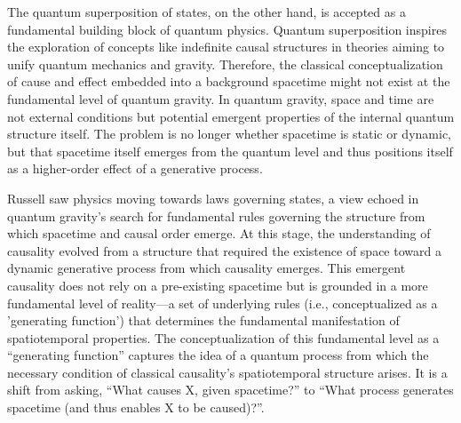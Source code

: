 The quantum superposition of states, on the other hand, is accepted as a fundamental building block of quantum physics. Quantum superposition inspires the exploration of concepts like indefinite causal structures in theories aiming to unify quantum mechanics and gravity. Therefore, the classical conceptualization of cause and effect embedded into a background spacetime might not exist at the fundamental level of quantum gravity. In quantum gravity, space and time are not external conditions but potential emergent properties of the internal quantum structure itself. The problem is no longer whether spacetime is static or dynamic, but that spacetime itself emerges from the quantum level and thus positions itself as a higher-order effect of a generative process.

Russell saw physics moving towards laws governing states, a view echoed in quantum gravity's search for fundamental rules governing the structure from which spacetime and causal order emerge. At this stage, the understanding of causality evolved from a structure that required the existence of space toward a dynamic generative process from which causality emerges. This emergent causality does not rely on a pre-existing spacetime but is grounded in a more fundamental level of reality—a set of underlying rules (i.e., conceptualized as a 'generating function') that determines the fundamental manifestation of spatiotemporal properties. The conceptualization of this fundamental level as a ``generating function'' captures the idea of a quantum process from which the necessary condition of classical causality's spatiotemporal structure arises. It is a shift from asking, ``What causes X, given spacetime?'' to ``What process generates spacetime (and thus enables X to be caused)?''.

\newpage
